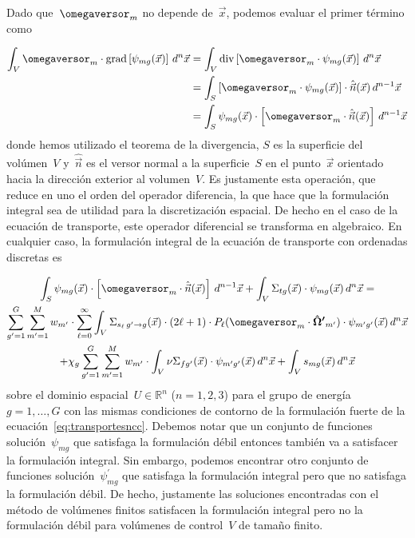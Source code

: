 Dado que~$\omegaversor_m$ no depende de~$\vec{x}$, podemos evaluar el primer término como

\begin{align*}
 \int_V \omegaversor_m \cdot \text{grad} \left[ \psi_{mg}(\vec{x}) \right] \, d^n\vec{x} &=
 \int_V \text{div} \left[ \omegaversor_m \cdot \psi_{mg}(\vec{x}) \right] \, d^n\vec{x} \\
&=
 \int_S \left[ \omegaversor_m \cdot \psi_{mg}(\vec{x}) \right] \cdot \hat{\vec{n}}(\vec{x}) \, d^{n-1}\vec{x} \\
&=
 \int_S \psi_{mg}(\vec{x}) \cdot \left[ \omegaversor_m \cdot \hat{\vec{n}}(\vec{x})\right]  \, d^{n-1}\vec{x}
\end{align*}
%
donde hemos utilizado el teorema de la divergencia, $S$ es la superficie del volúmen~$V$ y~$\hat{\vec{n}}$ es el versor normal a la superficie~$S$ en el punto~$\vec{x}$ orientado hacia la dirección exterior al volumen~$V$. Es justamente esta operación, que reduce en uno el orden del operador diferencia, la que hace que la formulación integral sea de utilidad para la discretización espacial. De hecho en el caso de la ecuación de transporte, este operador diferencial se transforma en algebraico. En cualquier caso, la formulación integral de la ecuación de transporte con ordenadas discretas es


\begin{multline}\label{eq:transportesnintegral}
 \int_S \psi_{mg}(\vec{x}) \cdot \left[ \omegaversor_m \cdot \hat{\vec{n}}(\vec{x})\right]  \, d^{n-1}\vec{x}
 +
 \int_V \Sigma_{t g}(\vec{x}) \cdot \psi_{mg}(\vec{x}) \, d^n\vec{x} = \\
 \sum_{g^\prime=1}^G \sum_{m^\prime=1}^M  w_{m^\prime} \cdot  \sum_{\ell=0}^\infty 
\int_V \Sigma_{s_\ell \,g^\prime \rightarrow g}(\vec{x}) \cdot (2\ell+1) \cdot P_\ell (\omegaversor_m \cdot \boldsymbol{\hat{\Omega}^\prime}_{m^\prime}) \cdot \psi_{m^\prime g^\prime}(\vec{x}) \, d^n\vec{x} \\
+
 \chi_g  \sum_{g^\prime=1}^G \sum_{m^\prime=1}^M  w_{m^\prime} \cdot \int_V \nu\Sigma_{fg^\prime}(\vec{x}) \cdot \psi_{m^\prime g^\prime}(\vec{x}) \, d^n\vec{x}
+
 \int_V s_{mg}(\vec{x}) \, d^n\vec{x}
\end{multline}
%
sobre el dominio espacial~$U \in \mathbb{R}^n$ ($n=1,2,3$) para el grupo de energía~$g=1,\dots,G$ con las mismas condiciones de contorno de la formulación fuerte de la ecuación~\eqref{eq:transportesncc}. Debemos notar que un conjunto de funciones solución~$\psi_{mg}$ que satisfaga la formulación débil entonces también va a satisfacer la formulación integral. Sin embargo, podemos encontrar otro conjunto de funciones solución~$\psi_{mg}^\prime$ que satisfaga la formulación integral pero que no satisfaga la formulación débil. De hecho, justamente las soluciones encontradas con el método de volúmenes finitos satisfacen la formulación integral pero no la formulación débil para volúmenes de control~$V$ de tamaño finito.

